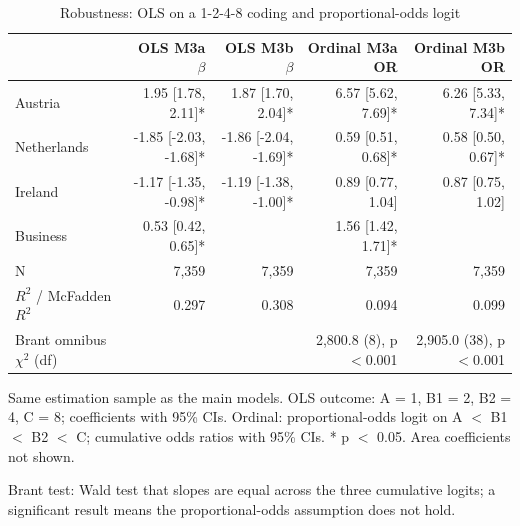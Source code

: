 \begin{table}[htbp]
\centering
\small
\begin{threeparttable}
\caption{Robustness: OLS on a 1-2-4-8 coding and proportional-odds logit}
\label{tab:regression-robustness}
\begin{tabular}{lrrrr}
\hline
 & OLS M3a $\beta$ & OLS M3b $\beta$ & Ordinal M3a OR & Ordinal M3b OR \\
\hline
Austria & 1.95 [1.78, 2.11]* & 1.87 [1.70, 2.04]* & 6.57 [5.62, 7.69]* & 6.26 [5.33, 7.34]* \\
Netherlands & -1.85 [-2.03, -1.68]* & -1.86 [-2.04, -1.69]* & 0.59 [0.51, 0.68]* & 0.58 [0.50, 0.67]* \\
Ireland & -1.17 [-1.35, -0.98]* & -1.19 [-1.38, -1.00]* & 0.89 [0.77, 1.04] & 0.87 [0.75, 1.02] \\
Business & 0.53 [0.42, 0.65]* &  & 1.56 [1.42, 1.71]* &  \\
\hline
N & 7,359 & 7,359 & 7,359 & 7,359 \\
$R^2$ / McFadden $R^2$ & 0.297 & 0.308 & 0.094 & 0.099 \\
Brant omnibus $\chi^2$ (df) &  &  & 2,800.8 (8), p $<$0.001 & 2,905.0 (38), p $<$0.001 \\
\hline
\end{tabular}
\begin{tablenotes}
\footnotesize
\item Same estimation sample as the main models. OLS outcome: A = 1, B1 = 2, B2 = 4, C = 8; coefficients with 95\% CIs. Ordinal: proportional-odds logit on A $<$ B1 $<$ B2 $<$ C; cumulative odds ratios with 95\% CIs. * p $<$ 0.05. Area coefficients not shown.
\item Brant test: Wald test that slopes are equal across the three cumulative logits; a significant result means the proportional-odds assumption does not hold.
\end{tablenotes}
\end{threeparttable}
\end{table}
